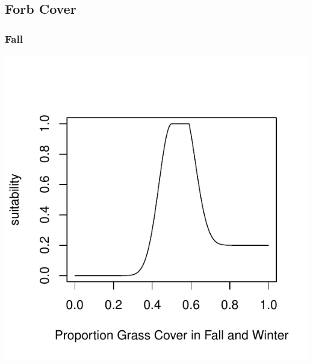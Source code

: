\documentclass[12pt,letterpaper]{article}\usepackage{graphicx, color}
\makeatletter
\def\maxwidth{ %
  \ifdim\Gin@nat@width>\linewidth
    \linewidth
  \else
    \Gin@nat@width
  \fi
}
\newenvironment{knitrout}{}{} %
\makeatother
\begin{document}
\subsection{Forb Cover}
\subsubsection{Fall}
\begin{knitrout}
\color{fgcolor}\includegraphics[width=\maxwidth]{figure/Sally-Dan_Forb_Cover_Fall} 
\end{knitrout}
\end{document}
